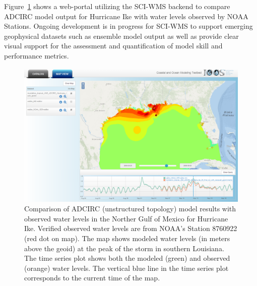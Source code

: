 \documentclass[11pt,twocolumn,twoside]{IEEEtran}
\newcommand{\sciwms}{SCI-WMS}
\begin{document}
Figure~\ref{fig:adcirc_comp} shows a web-portal utilizing the
\sciwms{} backend to compare ADCIRC model output for Hurricane Ike
with water levels observed by NOAA Stations. Ongoing development is in
progress for \sciwms{} to support emerging geophysical datasets such
as ensemble model output as well as provide clear visual support for
the assessment and quantification of model skill and performance
metrics.
\begin{figure}[ht!]
  \centering
  \includegraphics[width=0.9\columnwidth]{./figs/SciWMS_ModelObsComparison}
  \caption{Comparison of ADCIRC (unstructured topology) model results
    with observed water levels in the Norther Gulf of Mexico for
    Hurricane Ike. Verified observed water levels are from NOAA's
    Station 8760922 (red dot on map). The map shows modeled water
    levels (in meters above the geoid) at the peak of the storm in
    southern Louisiana. The time series plot shows both the modeled
    (green) and observed (orange) water levels. The vertical blue line
    in the time series plot corresponds to the current time of the
    map.}
  \label{fig:adcirc_comp}
\end{figure}


\end{document}
